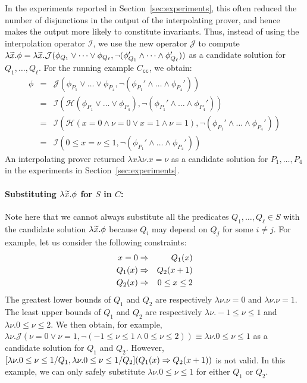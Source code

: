 In the experiments reported in Section~\ref{sec:experiments}, this often
reduced the number of disjunctions in the output of the interpolating
prover, and hence makes the output more likely to constitute invariants.
%
Thus, instead of using the interpolation operator \(\mathcal{I}\), we 
use the new operator \(\mathcal{J}\) to compute \(\lambda \widetilde{x}. 
\phi=\lambda\widetilde{x}.\mathcal{J}(\phi_{Q_1} \lor \dots\lor 
\phi_{Q_{\ell}},\neg (\phi_{Q_1}' \land \dots \land\phi_{Q_{\ell}}'))\) 
as a candidate solution for \(Q_1,\dots,Q_{\ell}\).  For the running 
example \(C_{\texttt{cc}}\), we obtain:
\begin{eqnarray*}
\phi &=& \mathcal{J}(\phi_{P_1} \lor \dots \lor \phi_{P_4},\neg (\phi_{P_1}' \land \dots \land \phi_{P_4}')) \\
&=& \mathcal{I}(\mathcal{H}(\phi_{P_1} \lor \dots \lor \phi_{P_4}),\neg (\phi_{P_1}' \land \dots \land \phi_{P_4}')) \\
&=& \mathcal{I}(\mathcal{H}(x=0 \land \nu=0 \lor x=1 \land \nu=1),\neg (\phi_{P_1}' \land \dots \land \phi_{P_4}')) \\
&=& \mathcal{I}(0 \leq x=\nu \leq 1,\neg (\phi_{P_1}' \land \dots \land \phi_{P_4}'))
\end{eqnarray*}
An interpolating prover returned \(\lambda x \lambda \nu.x=\nu\) as a 
candidate solution for \(P_1,\dots,P_4\) in the experiments in 
Section~\ref{sec:experiments}.

\paragraph{Substituting \(\lambda \widetilde{x}.\phi\) for \(S\) in \(C\):}
Note here that we cannot always substitute all the predicates 
\(Q_1,\dots,Q_{\ell} \in S\) with the candidate solution \(\lambda 
\widetilde{x}.\phi\) because \(Q_i\) may depend on \(Q_j\) for some \(i \neq 
j\).  For example, let us consider the following constraints:
\begin{eqnarray*}
x=0 &\Rightarrow& Q_1(x) \\
Q_1(x) &\Rightarrow& Q_2(x+1) \\
Q_2(x) &\Rightarrow& 0 \leq x \leq 2
\end{eqnarray*}
The greatest lower bounds of \(Q_1\) and \(Q_2\) are respectively 
\(\lambda \nu.\nu=0\) and \(\lambda \nu.\nu=1\).  The least upper bounds 
of \(Q_1\) and \(Q_2\) are respectively \(\lambda \nu.-1 \leq \nu\leq 1\) 
and \(\lambda \nu.0 \leq \nu \leq 2\).  We then obtain, for example, 
\(\lambda \nu.\mathcal{J}(\nu=0 \lor \nu=1,\neg (-1 \leq \nu\leq 1 \land 
0 \leq \nu \leq 2)) \equiv \lambda \nu.0 \leq \nu \leq 1\) as a 
candidate solution for \(Q_1\) and \(Q_2\).  However, \([\lambda\nu.0 
\leq \nu \leq 1/Q_1,\lambda \nu.0 \leq \nu \leq 1/Q_2](Q_1(x) \Rightarrow 
Q_2(x+1))\) is not valid.  In this example, we can only safely 
substitute \(\lambda \nu.0 \leq \nu\leq 1\) for either \(Q_1\) or \(Q_2\).

